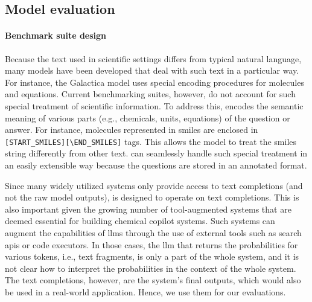 \documentclass[11pt, oneside]{article}
\begin{document}
\begin{refsection}
\subsection{Model evaluation}

\paragraph{Benchmark suite design} Because the text used in scientific settings differs from typical natural language, many models have been developed that deal with such text in a particular way.
For instance, the Galactica model\autocite{taylor2022galactica} uses special encoding procedures for molecules and equations.
Current benchmarking suites, however, do not account for such special treatment of scientific information.
To address this, \chembench encodes the semantic meaning of various parts (e.g., chemicals, units, equations) of the question or answer.
For instance, molecules represented in \gls{smiles} are enclosed in \texttt{[START\_SMILES][\textbackslash END\_SMILES]} tags.
This allows the model to treat the \gls{smiles} string differently from other text.
\chembench can seamlessly handle such special treatment in an easily extensible way because the questions are stored in an annotated format.

Since many widely utilized systems only provide access to text completions (and not the raw model outputs), \chembench is designed to operate on text completions.
This is also important given the growing number of tool-augmented systems that are deemed essential for building chemical copilot systems.
Such systems can augment the capabilities of \glspl{llm} through the use of external tools such as search \glspl{api} or code executors.\autocite{schick2024toolformer, karpas2022mrkl, yao2022react}
In those cases, the \gls{llm} that returns the probabilities for various tokens, i.e., text fragments, is only a part of the whole system, and it is not clear how to interpret the probabilities in the context of the whole system.
The text completions, however, are the system's final outputs, which would also be used in a real-world application.
Hence, we use them for our evaluations.\autocite{xiong2023llms}


\end{refsection}
\end{document}
